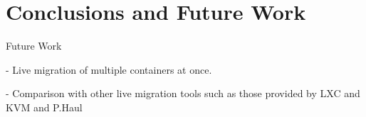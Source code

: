 \chapter{Conclusions and Future Work} \label{chap:conclusion}

Future Work

- Live migration of multiple containers at once.

- Comparison with other live migration tools such as those provided by LXC and KVM and P.Haul

